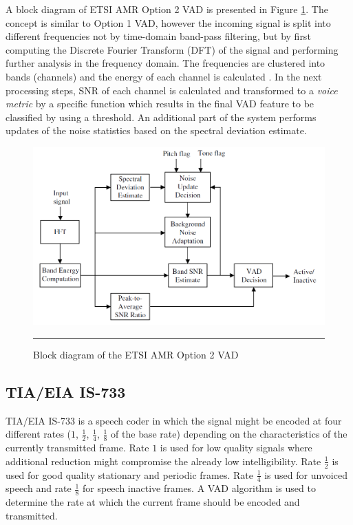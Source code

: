 A block diagram of ETSI AMR Option 2 VAD is presented in Figure \ref{fig:AMR2}. The concept is similar to Option 1 VAD, however the incoming signal is split into different frequencies not by time-domain band-pass filtering, but by first computing the Discrete Fourier Transform (DFT) of the signal and performing further analysis in the frequency domain. The frequencies are clustered into bands (channels) and the energy of each channel is calculated \citep{Cornu}. In the next processing steps, SNR of each channel is calculated and transformed to a \emph{voice metric} by a specific function which results in the final VAD feature to be classified by using a threshold. An additional part of the system performs updates of the noise statistics based on the spectral deviation estimate.

\begin{figure}[htbp]
	\centering
		\includegraphics[width=0.9\columnwidth]{Figures/Chapter2/AMR2.png}
		\rule{37em}{0.5pt}
	\caption[Block diagram of the ETSI AMR Option 2 VAD]{Block diagram of the ETSI AMR Option 2 VAD \cite{Kondoz}}
	\label{fig:AMR2}
\end{figure}

\subsection{TIA/EIA IS-733}

TIA/EIA IS-733 is a speech coder in which the signal might be encoded at four different rates ($1$, $\frac{1}{2}$, $\frac{1}{4}$, $\frac{1}{8}$ of the base rate) depending on the characteristics of the currently transmitted frame. Rate $1$ is used for low quality signals where additional reduction might compromise the already low intelligibility. Rate $\frac{1}{2}$ is used for good quality stationary and periodic frames. Rate $\frac{1}{4}$ is used for unvoiced speech and rate $\frac{1}{8}$ for speech inactive frames. A VAD algorithm is used to determine the rate at which the current frame should be encoded and transmitted.

